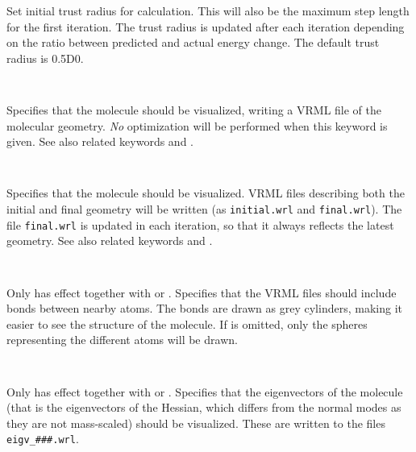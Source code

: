 \begin{description}
Set initial trust radius for calculation. This will also be the
maximum step length for the first iteration. The trust radius is
updated after each iteration depending on the ratio between predicted
and actual energy change. The default trust radius is 0.5D0.

\item[\Key{VISUAL}]\verb| |

Specifies that the molecule should be visualized,
writing a VRML file of the molecular geometry. {\em{No}} optimization
will be performed when this keyword is given. See also related
keywords  and .

\item[\Key{VRML}]\verb| |

Specifies that the molecule should be
visualized. VRML files describing both the initial and final geometry
will be written (as \verb|initial.wrl| and \verb|final.wrl|). The file
\verb|final.wrl| is  updated in each iteration, so that it always
reflects the latest geometry. See also related keywords 
and .

\item[\Key{VR-BON}]\verb| |

Only has effect together with  or . Specifies
that the VRML files should include bonds between nearby atoms. The
bonds are drawn as grey cylinders, making it easier to see the
structure of the molecule. If  is omitted, only the
spheres representing the different atoms will be drawn.

\item[\Key{VR-EIG}]\verb| |

Only has effect together with  or . Specifies
that the eigenvectors of the molecule (that is the eigenvectors of the
Hessian, which differs from the normal modes as they are not
mass-scaled) should be visualized. These are written to the files
\verb|eigv_###.wrl|.

\end{description}

\begin{thebibliography}{}
\end{thebibliography}
